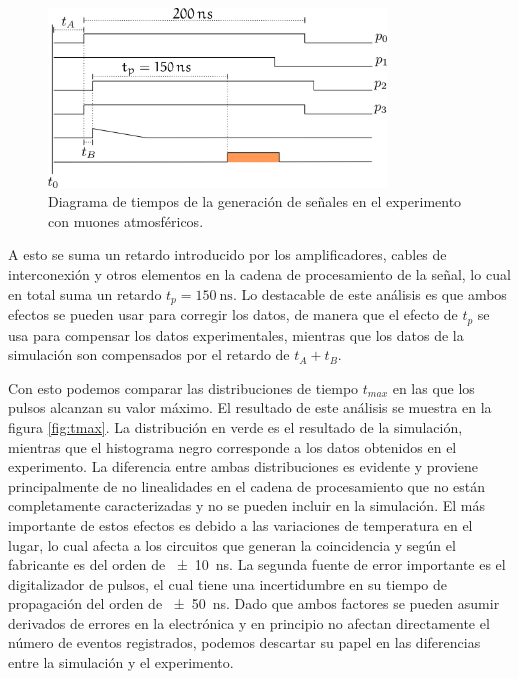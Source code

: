 \begin{figure}
        \centering
        \includegraphics[width=0.8\textwidth]{muons-experiment-1.pdf}
        \caption{Diagrama de tiempos de la generación de señales en el experimento con muones atmosféricos.}
        \label{fig:muons-experiment-1}
\end{figure}

A esto se suma un retardo introducido por los amplificadores, cables de interconexión y otros elementos en la cadena de procesamiento de la señal, lo cual en total suma un retardo $t_{p}=\SI{150}{\ns}$. Lo destacable de este análisis es que ambos efectos se pueden usar para corregir los datos, de manera que el efecto de $t_{p}$ se usa para compensar los datos experimentales, mientras que los datos de la simulación son compensados por el retardo de $t_{A}+t_{B}$.

Con esto podemos comparar las distribuciones de tiempo $t_{max}$ en las que los pulsos alcanzan su valor máximo. El resultado de este análisis se muestra en la figura \ref{fig:tmax}. La distribución en verde es el resultado de la simulación, mientras que el histograma negro corresponde a los datos obtenidos en el experimento. La diferencia entre ambas distribuciones es evidente y proviene principalmente de no linealidades en el cadena de procesamiento que no están completamente caracterizadas y no se pueden incluir en la simulación. El más importante de estos efectos es debido a las variaciones de temperatura en el lugar, lo cual afecta a los circuitos que generan la coincidencia y según el fabricante es del orden de \SI{\pm 10}{\ns}. La segunda fuente de error importante es el digitalizador de pulsos, el cual tiene una incertidumbre en su tiempo de propagación del orden de \SI{\pm 50}{\ns}. Dado que ambos factores se pueden asumir derivados de errores en la electrónica y en principio no afectan directamente el número de eventos registrados, podemos descartar su papel en las diferencias entre la simulación y el experimento.

